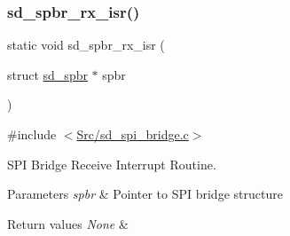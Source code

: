 \mbox{\label{group___s_d___s_p_i___bridge_ga303d9b609ad91e21cf2d9ae010dc620d}} 
\subsubsection{\texorpdfstring{sd\+\_\+spbr\+\_\+rx\+\_\+isr()}{sd\_spbr\_rx\_isr()}}
{\footnotesize\ttfamily static void sd\+\_\+spbr\+\_\+rx\+\_\+isr (\begin{DoxyParamCaption}\item[{struct \mbox{\hyperlink{structsd__spbr}{sd\+\_\+spbr}} $\ast$}]{spbr }\end{DoxyParamCaption})\hspace{0.3cm}{\ttfamily [static]}}



{\ttfamily \#include $<$\mbox{\hyperlink{sd__spi__bridge_8c}{Src/sd\+\_\+spi\+\_\+bridge.\+c}}$>$}



S\+PI Bridge Receive Interrupt Routine. 


\begin{DoxyParams}{Parameters}
{\em spbr} & Pointer to S\+PI bridge structure \\
\hline
\end{DoxyParams}

\begin{DoxyRetVals}{Return values}
{\em None} & \\
\hline
\end{DoxyRetVals}

